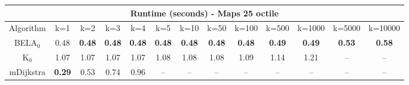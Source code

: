 \begin{tabular}{c|cccccccccccc}\toprule
\multicolumn{13}{c}{Runtime (seconds) - Maps 25 octile}\\ \midrule
Algorithm & k=1 & k=2 & k=3 & k=4 & k=5 & k=10 & k=50 & k=100 & k=500 & k=1000 & k=5000 & k=10000 \\ \midrule
BELA$_0$ & 0.48 & \textbf{0.48} & \textbf{0.48} & \textbf{0.48} & \textbf{0.48} & \textbf{0.48} & \textbf{0.48} & \textbf{0.48} & \textbf{0.49} & \textbf{0.49} & \textbf{0.53} & \textbf{0.58} \\
K$_0$ & 1.07 & 1.07 & 1.07 & 1.07 & 1.08 & 1.08 & 1.08 & 1.09 & 1.14 & 1.21 & -- & -- \\
mDijkstra & \textbf{0.29} & 0.53 & 0.74 & 0.96 & -- & -- & -- & -- & -- & -- & -- & -- \\ \bottomrule 
\end{tabular}

